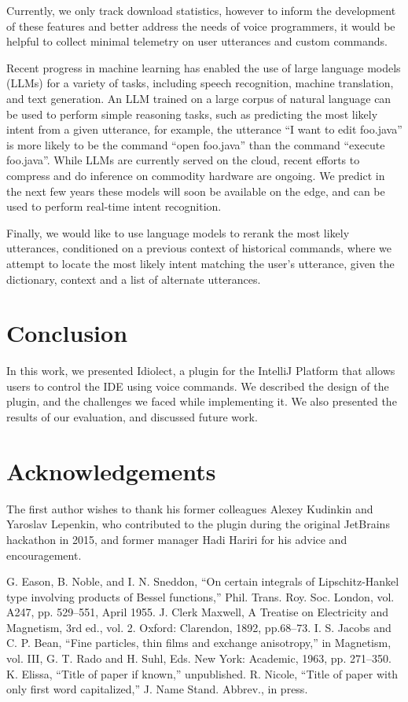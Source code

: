 \documentclass[conference]{IEEEtran}
\begin{document}
Currently, we only track download statistics, however to inform the development of these features and better address the needs of voice programmers, it would be helpful to collect minimal telemetry on user utterances and custom commands.

Recent progress in machine learning has enabled the use of large language models (LLMs) for a variety of tasks, including speech recognition, machine translation, and text generation. An LLM trained on a large corpus of natural language can be used to perform simple reasoning tasks, such as predicting the most likely intent from a given utterance, for example, the utterance ``I want to edit foo.java'' is more likely to be the command ``open foo.java'' than the command ``execute foo.java''. While LLMs are currently served on the cloud, recent efforts to compress and do inference on commodity hardware are ongoing. We predict in the next few years these models will soon be available on the edge, and can be used to perform real-time intent recognition.

Finally, we would like to use language models to rerank the most likely utterances, conditioned on a previous context of historical commands, where we attempt to locate the most likely intent matching the user's utterance, given the dictionary, context and a list of alternate utterances.

\section{Conclusion}

In this work, we presented Idiolect, a plugin for the IntelliJ Platform that allows users to control the IDE using voice commands. We described the design of the plugin, and the challenges we faced while implementing it. We also presented the results of our evaluation, and discussed future work.

\section{Acknowledgements}

The first author wishes to thank his former colleagues Alexey Kudinkin and Yaroslav Lepenkin, who contributed to the plugin during the original JetBrains hackathon in 2015, and former manager Hadi Hariri for his advice and encouragement.

\begin{thebibliography}{00}
 G. Eason, B. Noble, and I. N. Sneddon, ``On certain integrals of Lipschitz-Hankel type involving products of Bessel functions,'' Phil. Trans. Roy. Soc. London, vol. A247, pp. 529--551, April 1955.
 J. Clerk Maxwell, A Treatise on Electricity and Magnetism, 3rd ed., vol. 2. Oxford: Clarendon, 1892, pp.68--73.
 I. S. Jacobs and C. P. Bean, ``Fine particles, thin films and exchange anisotropy,'' in Magnetism, vol. III, G. T. Rado and H. Suhl, Eds. New York: Academic, 1963, pp. 271--350.
 K. Elissa, ``Title of paper if known,'' unpublished.
 R. Nicole, ``Title of paper with only first word capitalized,'' J. Name Stand. Abbrev., in press.
\end{thebibliography}
\end{document}
